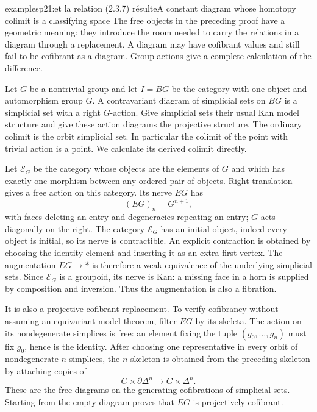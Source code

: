 \begin{dcomment}{examples}{p21:et la relation (2.3.7) résulte}{A constant diagram whose homotopy colimit is a classifying space}
The free objects in the preceding proof have a geometric meaning: they introduce the room needed to carry the relations in a diagram through a replacement. A diagram may have cofibrant values and still fail to be cofibrant as a diagram. Group actions give a complete calculation of the difference.

Let $G$ be a nontrivial group and let $I=BG$ be the category with one object and automorphism group $G$. A contravariant diagram of simplicial sets on $BG$ is a simplicial set with a right $G$-action. Give simplicial sets their usual Kan model structure and give these action diagrams the projective structure. The ordinary colimit is the orbit simplicial set. In particular the colimit of the point with trivial action is a point. We calculate its derived colimit directly.

Let $\mathcal E_G$ be the category whose objects are the elements of $G$ and which has exactly one morphism between any ordered pair of objects. Right translation gives a free action on this category. Its nerve $EG$ has
\[
 (EG)_n=G^{n+1},
\]
with faces deleting an entry and degeneracies repeating an entry; $G$ acts diagonally on the right. The category $\mathcal E_G$ has an initial object, indeed every object is initial, so its nerve is contractible. An explicit contraction is obtained by choosing the identity element and inserting it as an extra first vertex. The augmentation $EG\to *$ is therefore a weak equivalence of the underlying simplicial sets. Since $\mathcal E_G$ is a groupoid, its nerve is Kan: a missing face in a horn is supplied by composition and inversion. Thus the augmentation is also a fibration.

It is also a projective cofibrant replacement. To verify cofibrancy without assuming an equivariant model theorem, filter $EG$ by its skeleta. The action on its nondegenerate simplices is free: an element fixing the tuple $(g_0,\ldots,g_n)$ must fix $g_0$, hence is the identity. After choosing one representative in every orbit of nondegenerate $n$-simplices, the $n$-skeleton is obtained from the preceding skeleton by attaching copies of
\[
 G\times\partial\Delta^n\longrightarrow G\times\Delta^n.
\]
These are the free diagrams on the generating cofibrations of simplicial sets. Starting from the empty diagram proves that $EG$ is projectively cofibrant.


\end{dcomment}
